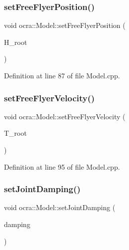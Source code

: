 \subsubsection{\texorpdfstring{set\+Free\+Flyer\+Position()}{setFreeFlyerPosition()}}
{\footnotesize\ttfamily void ocra\+::\+Model\+::set\+Free\+Flyer\+Position (\begin{DoxyParamCaption}\item[{const Eigen\+::\+Displacementd \&}]{H\+\_\+root }\end{DoxyParamCaption})}



Definition at line 87 of file Model.\+cpp.

\hypertarget{classocra_1_1Model_a26ce45e1b06e3f1074b4066dbb420865}{}\label{classocra_1_1Model_a26ce45e1b06e3f1074b4066dbb420865} 
\subsubsection{\texorpdfstring{set\+Free\+Flyer\+Velocity()}{setFreeFlyerVelocity()}}
{\footnotesize\ttfamily void ocra\+::\+Model\+::set\+Free\+Flyer\+Velocity (\begin{DoxyParamCaption}\item[{const Eigen\+::\+Twistd \&}]{T\+\_\+root }\end{DoxyParamCaption})}



Definition at line 95 of file Model.\+cpp.

\hypertarget{classocra_1_1Model_a14b26b592ba1fe5d01c2f10120e59bcc}{}\label{classocra_1_1Model_a14b26b592ba1fe5d01c2f10120e59bcc} 
\subsubsection{\texorpdfstring{set\+Joint\+Damping()}{setJointDamping()}}
{\footnotesize\ttfamily void ocra\+::\+Model\+::set\+Joint\+Damping (\begin{DoxyParamCaption}\item[{const Eigen\+::\+Vector\+Xd \&}]{damping }\end{DoxyParamCaption})}



